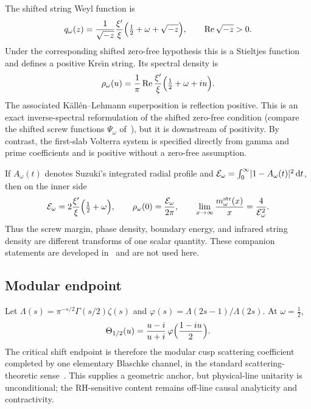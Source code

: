 \documentclass[11pt,a4paper]{article}
\renewcommand{\Re}{\operatorname{Re}}
\newcommand{\dd}{\,\mathrm d}
\DeclarePairedDelimiter{\abs}{\lvert}{\rvert}
\theoremstyle{plain}
\theoremstyle{definition}
\numberwithin{equation}{section}
\begin{document}
The shifted string Weyl function is
\begin{equation}
q_\omega(z)=\frac1{\sqrt{-z}}\frac{\xi'}{\xi}\Bigl(\tfrac12+\omega+\sqrt{-z}\Bigr),
\qquad\Re\sqrt{-z}>0 .
\end{equation}
Under the corresponding shifted zero-free hypothesis this is a Stieltjes
function and defines a positive Kre\u{\i}n string. Its spectral density is
\begin{equation}
\rho_\omega(u)=\frac1\pi\Re\frac{\xi'}{\xi}\Bigl(\tfrac12+\omega+iu\Bigr).
\end{equation}
The associated K\"all\'en--Lehmann superposition is reflection positive. This
is an exact inverse-spectral reformulation of the shifted zero-free condition
(compare the shifted screw functions $\Psi_\omega$
of~\cite[Sect.~11]{Suzuki2022screw}), but it is downstream of positivity. By
contrast, the first-slab Volterra system is specified directly from gamma and
prime coefficients and is positive without a zero-free assumption.

If $A_\omega(t)$ denotes Suzuki's integrated radial profile and
$\mathcal E_\omega=\int_0^\infty\abs{1-A_\omega(t)}^2\dd t$, then on the inner
side
\begin{equation}
\mathcal E_\omega=2\frac{\xi'}{\xi}\Bigl(\tfrac12+\omega\Bigr),
\qquad
\rho_\omega(0)=\frac{\mathcal E_\omega}{2\pi},
\qquad
\lim_{x\to\infty}\frac{m^{\mathrm{str}}_\omega(x)}{x}=\frac4{\mathcal E_\omega^2}.
\end{equation}
Thus the screw margin, phase density, boundary energy, and infrared string
density are different transforms of one scalar quantity. These companion
statements are developed in~\cite{Baker2026string,Baker2026margin,Baker2026depth}
and are not used here.

\subsection{Modular endpoint}

Let $\Lambda(s)=\pi^{-s/2}\Gamma(s/2)\zeta(s)$ and
$\varphi(s)=\Lambda(2s-1)/\Lambda(2s)$. At $\omega=\tfrac12$,
\begin{equation}
\Theta_{1/2}(u)=\frac{u-i}{u+i}\,\varphi\Bigl(\frac{1-iu}2\Bigr).
\end{equation}
The critical shift endpoint is therefore the modular cusp scattering
coefficient completed by one elementary Blaschke channel, in the standard
scattering-theoretic sense~\cite{GrahamZworski2003}. This supplies a geometric
anchor, but physical-line unitarity is unconditional; the RH-sensitive
content remains off-line causal analyticity and contractivity.
\end{document}
